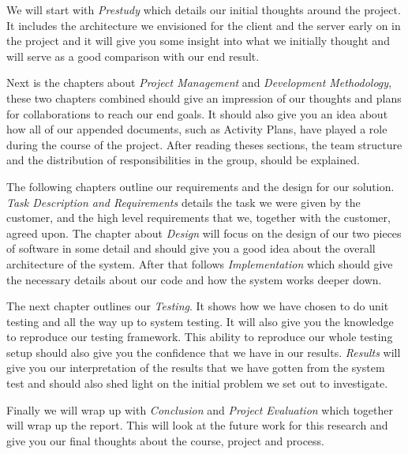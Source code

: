     We will start with \emph{Prestudy} which details our initial thoughts around the project. It includes the architecture we envisioned for the client and the server early on in the project and it will give you some insight into what we initially thought and will serve as a good comparison with our end result.
    
    Next is the chapters about \emph{Project Management} and \emph{Development Methodology}, these two chapters combined should give an impression of our thoughts and plans for collaborations to reach our end goals. It should also give you an idea about how all of our appended documents, such as Activity Plans, have played a role during the course of the project. After reading theses sections, the team structure and the distribution of responsibilities in the group, should be explained.
    
    The following chapters outline our requirements and the design for our solution. \emph{Task Description and Requirements} details the task we were given by the customer, and the high level requirements that we, together with the customer, agreed upon. The chapter about \emph{Design} will focus on the design of our two pieces of software in some detail and should give you a good idea about the overall architecture of the system. After that follows \emph{Implementation} which should give the necessary details about our code and how the system works deeper down.
    
    The next chapter outlines our \emph{Testing}. It shows how we have chosen to do unit testing and all the way up to system testing. It will also give you the knowledge to reproduce our testing framework. This ability to reproduce our whole testing setup should also give you the confidence that we have in our results. \emph{Results} will give you our interpretation of the results that we have gotten from the system test and should also shed light on the initial problem we set out to investigate.
    
    Finally we will wrap up with \emph{Conclusion} and \emph{Project Evaluation} which together will wrap up the report. This will look at the future work for this research and give you our final thoughts about the course, project and process.
    
    

